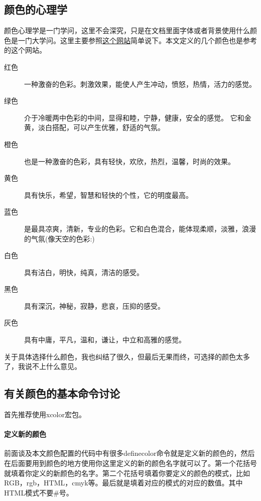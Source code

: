 \subsection{颜色的心理学}
颜色心理学是一门学问，这里不会深究，只是在文档里面字体或者背景使用什么颜色是一门大学问。这里主要参照\href{http://www.jb51.net/article/8216.htm}{这个网站}简单说下。本文定义的几个颜色也是参考的这个网站。

\begin{description}
\item[红色] 一种激奋的色彩。刺激效果，能使人产生冲动，愤怒，热情，活力的感觉。
\item[绿色] 介于冷暖两中色彩的中间，显得和睦，宁静，健康，安全的感觉。 它和金黄，淡白搭配，可以产生优雅，舒适的气氛。
\item[橙色] 也是一种激奋的色彩，具有轻快，欢欣，热烈，温馨，时尚的效果。
\item[黄色] 具有快乐，希望，智慧和轻快的个性，它的明度最高。 
\item[蓝色] 是最具凉爽，清新，专业的色彩。它和白色混合，能体现柔顺，淡雅，浪漫的气氛(像天空的色彩:) 
\item[白色] 具有洁白，明快，纯真，清洁的感受。 
\item[黑色] 具有深沉，神秘，寂静，悲哀，压抑的感受。 
\item[灰色] 具有中庸，平凡，温和，谦让，中立和高雅的感觉。 　　
\end{description}
关于具体选择什么颜色，我也纠结了很久，但最后无果而终，可选择的颜色太多了，我说不上什么意见。

\subsection{有关颜色的基本命令讨论}
首先推荐使用xcolor宏包。

\paragraph{定义新的颜色}
前面谈及本文颜色配置的代码中有很多definecolor命令就是定义新的颜色的，然后在后面要用到颜色的地方使用你这里定义的新的颜色名字就可以了。第一个花括号就填着你定义的新颜色的名字。第二个花括号填着你要定义的颜色的模式，比如RGB，rgb，HTML，cmyk等。最后就是填着对应的模式的对应的数值。其中HTML模式不要\#号。

